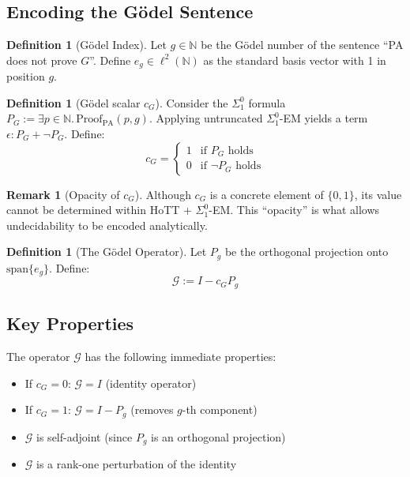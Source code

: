\documentclass[11pt]{article}
\theoremstyle{definition}
\newtheorem{definition}[theorem]{Definition}
\newtheorem{remark}[theorem]{Remark}
\newcommand{\N}{\mathbb{N}}
\newcommand{\lp}{\ell^{2}(\N)}
\newcommand{\SigOne}{\Sigma^{0}_{\!1}}
\newcommand{\PA}{\mathrm{PA}}
\begin{document}
\subsection{Encoding the Gödel Sentence}

\begin{definition}[Gödel Index]
Let $g \in \N$ be the Gödel number of the sentence ``PA does not prove $G$''. Define $e_g \in \lp$ as the standard basis vector with 1 in position $g$.
\end{definition}

\begin{definition}[Gödel scalar $c_G$]\label{def:cg}
Consider the $\SigOne$ formula $P_G := \exists p \in \N.\, \text{Proof}_{\PA}(p,g)$. Applying untruncated $\SigOne$-EM yields a term $\epsilon: P_G + \neg P_G$. Define:
\[
c_G = \begin{cases}
1 & \text{if } P_G \text{ holds} \\
0 & \text{if } \neg P_G \text{ holds}
\end{cases}
\]
\end{definition}

\begin{remark}[Opacity of $c_G$]
Although $c_G$ is a concrete element of $\{0,1\}$, its value cannot be determined within HoTT + $\SigOne$-EM. This ``opacity'' is what allows undecidability to be encoded analytically.
\end{remark}

\begin{definition}[The Gödel Operator]
Let $P_g$ be the orthogonal projection onto $\text{span}\{e_g\}$. Define:
\[
\mathcal{G} := I - c_G P_g
\]
\end{definition}

\subsection{Key Properties}

The operator $\mathcal{G}$ has the following immediate properties:
\begin{itemize}
\item If $c_G = 0$: $\mathcal{G} = I$ (identity operator)
\item If $c_G = 1$: $\mathcal{G} = I - P_g$ (removes $g$-th component)
\item $\mathcal{G}$ is self-adjoint (since $P_g$ is an orthogonal projection)
\item $\mathcal{G}$ is a rank-one perturbation of the identity
\end{itemize}
\end{document}
